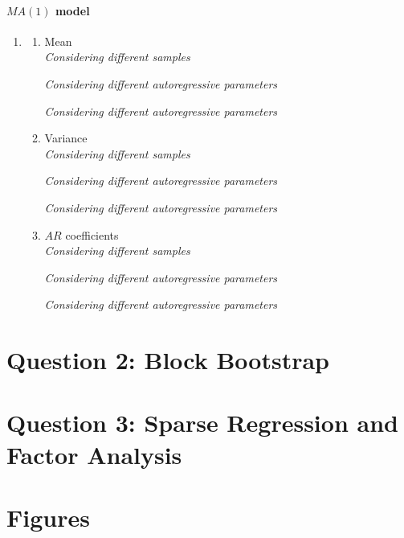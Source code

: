 \documentclass{article}
\begin{document}
\paragraph{$MA(1)$ model}
\begin{enumerate}
    \item 
    \begin{enumerate}
        \item Mean \\ \textit{Considering different samples}
        
        \par
        \textit{Considering different autoregressive parameters}
        
         \par
        \textit{Considering different autoregressive parameters}
        
        \item Variance \\ \textit{Considering different samples}
        
        \par
        \textit{Considering different autoregressive parameters}
        
         \par
        \textit{Considering different autoregressive parameters}
        
        \item $AR$ coefficients \\ \textit{Considering different samples}
        
        \par
        \textit{Considering different autoregressive parameters}
        
         \par
        \textit{Considering different autoregressive parameters}
        
    \end{enumerate}
\end{enumerate}


\section{Question 2: Block Bootstrap}
\section{Question 3: Sparse Regression and Factor Analysis}


\clearpage
\appendix
\section{Figures}
\end{document}
